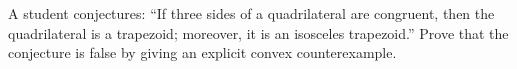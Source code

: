 A student conjectures: ``If three sides of a quadrilateral are congruent, then the quadrilateral is a trapezoid; moreover, it is an isosceles trapezoid.'' Prove that the conjecture is false by giving an explicit convex counterexample.
